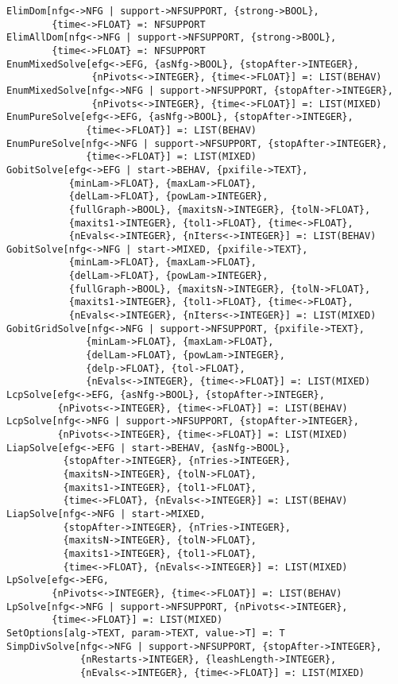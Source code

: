 \begin{verbatim}
ElimDom[nfg<->NFG | support->NFSUPPORT, {strong->BOOL}, 
        {time<->FLOAT} =: NFSUPPORT
ElimAllDom[nfg<->NFG | support->NFSUPPORT, {strong->BOOL}, 
        {time<->FLOAT} =: NFSUPPORT
EnumMixedSolve[efg<->EFG, {asNfg->BOOL}, {stopAfter->INTEGER},
               {nPivots<->INTEGER}, {time<->FLOAT}] =: LIST(BEHAV)
EnumMixedSolve[nfg<->NFG | support->NFSUPPORT, {stopAfter->INTEGER},
               {nPivots<->INTEGER}, {time<->FLOAT}] =: LIST(MIXED)
EnumPureSolve[efg<->EFG, {asNfg->BOOL}, {stopAfter->INTEGER},
              {time<->FLOAT}] =: LIST(BEHAV)
EnumPureSolve[nfg<->NFG | support->NFSUPPORT, {stopAfter->INTEGER}, 
              {time<->FLOAT}] =: LIST(MIXED) 
GobitSolve[efg<->EFG | start->BEHAV, {pxifile->TEXT},
           {minLam->FLOAT}, {maxLam->FLOAT},
           {delLam->FLOAT}, {powLam->INTEGER},
           {fullGraph->BOOL}, {maxitsN->INTEGER}, {tolN->FLOAT},
           {maxits1->INTEGER}, {tol1->FLOAT}, {time<->FLOAT},
           {nEvals<->INTEGER}, {nIters<->INTEGER}] =: LIST(BEHAV)
GobitSolve[nfg<->NFG | start->MIXED, {pxifile->TEXT},
           {minLam->FLOAT}, {maxLam->FLOAT},
           {delLam->FLOAT}, {powLam->INTEGER},
           {fullGraph->BOOL}, {maxitsN->INTEGER}, {tolN->FLOAT},
           {maxits1->INTEGER}, {tol1->FLOAT}, {time<->FLOAT},
           {nEvals<->INTEGER}, {nIters<->INTEGER}] =: LIST(MIXED)
GobitGridSolve[nfg<->NFG | support->NFSUPPORT, {pxifile->TEXT},
              {minLam->FLOAT}, {maxLam->FLOAT}, 
              {delLam->FLOAT}, {powLam->INTEGER}, 
              {delp->FLOAT}, {tol->FLOAT},
              {nEvals<->INTEGER}, {time<->FLOAT}] =: LIST(MIXED)
LcpSolve[efg<->EFG, {asNfg->BOOL}, {stopAfter->INTEGER},
         {nPivots<->INTEGER}, {time<->FLOAT}] =: LIST(BEHAV)
LcpSolve[nfg<->NFG | support->NFSUPPORT, {stopAfter->INTEGER},
         {nPivots<->INTEGER}, {time<->FLOAT}] =: LIST(MIXED)
LiapSolve[efg<->EFG | start->BEHAV, {asNfg->BOOL},
          {stopAfter->INTEGER}, {nTries->INTEGER},
          {maxitsN->INTEGER}, {tolN->FLOAT},
          {maxits1->INTEGER}, {tol1->FLOAT},
          {time<->FLOAT}, {nEvals<->INTEGER}] =: LIST(BEHAV)
LiapSolve[nfg<->NFG | start->MIXED, 
          {stopAfter->INTEGER}, {nTries->INTEGER},
          {maxitsN->INTEGER}, {tolN->FLOAT},
          {maxits1->INTEGER}, {tol1->FLOAT},
          {time<->FLOAT}, {nEvals<->INTEGER}] =: LIST(MIXED)
LpSolve[efg<->EFG,
        {nPivots<->INTEGER}, {time<->FLOAT}] =: LIST(BEHAV)
LpSolve[nfg<->NFG | support->NFSUPPORT, {nPivots<->INTEGER},
        {time<->FLOAT}] =: LIST(MIXED)
SetOptions[alg->TEXT, param->TEXT, value->T] =: T
SimpDivSolve[nfg<->NFG | support->NFSUPPORT, {stopAfter->INTEGER}, 
             {nRestarts->INTEGER}, {leashLength->INTEGER},
             {nEvals<->INTEGER}, {time<->FLOAT}] =: LIST(MIXED)
\end{verbatim}

